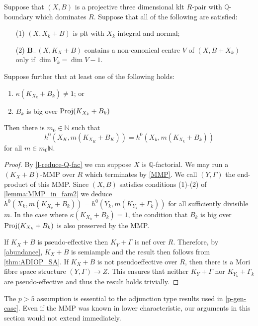 \documentclass[a4paper,12pt]{book}
\begin{document}
	\begin{theorem}\label{thm:ADIOP_final2}
		Suppose that $(X,B)$ is a projective three dimensional klt $R$-pair with $\mathbb{Q}$-boundary which dominates $R$.
		Suppose that all of the following are satisfied:
		
		\begin{enumerate}
			\item[(1)] $(X, X_{k}+B)$ is plt with $X_k$ integral and normal;
			\item[(2)]  ${\mathbf{B}_{-}(X, K_{X}+B)}$ contains a non-canonical centre $V$ of $(X,B+X_{k})$ only if $\dim V_{k}=\dim V -1$.
		\end{enumerate}
		
		Suppose further that at least one of the following holds:
		\begin{enumerate}
			\item $\kappa(K_{X_{k}}+B_{k}) \neq 1$; or
			\item $B_{k}$ is big over $\textup{Proj}(K_{X_{k}}+B_{k})$
		\end{enumerate}	
		Then there is $m_{0} \in \mathbb{N}$ such that 
		$$h^{0}(X_{K},m(K_{X_{K}}+B_{K}))=h^{0}(X_{k},m(K_{X_{k}}+B_{k}))$$
		for all $m \in m_{0}\mathbb{N}$.
		
	\end{theorem}
	
	\begin{proof}
		By \autoref{l-reduce-Q-fac} we can suppose $X$ is $\mathbb{Q}$-factorial.
		We may run a $(K_X+B)$-MMP over $R$ which terminates by \autoref{MMP}. 
		We call $(Y,\Gamma)$ the end-product of this MMP. Since $(X,B)$ satisfies conditions (1)-(2) of \autoref{lemma:MMP_in_fam2} we deduce $h^{0}(X_{k},m(K_{X_{k}} + B_{k}))=h^0(Y_k, m(K_{Y_k}+\Gamma_k))$ for all sufficiently divisible $m$. 
		In the case where $\kappa(K_{X_{k}}+B_{k})=1$, the condition that $B_{k}$ is big over $\textup{Proj}(K_{X_{k}}+B_{k})$ is also preserved by the MMP.
		
		If $K_{X}+B$ is pseudo-effective then $K_Y+\Gamma$ is nef over $R$. Therefore, by \autoref{abundance}, $K_{X}+B$ is semiample and the result then follows from \autoref{thm:ADIOP_SA}. 
		If $K_X+B$ is not pseudoeffective over $R$, then there is a Mori fibre space structure $(Y,\Gamma) \to Z$. This ensures that neither $K_{Y}+\Gamma$ nor $K_{Y_{k}}+\Gamma_{k}$ are pseudo-effective and thus the result holds trivially. 
	\end{proof}
	
	
	\begin{remark}	
		The $p>5$ assumption is essential to the adjunction type results used  in \autoref{p-gen-case}. Even if the MMP was known in lower characteristic, our arguments in this section would not extend immediately.
	\end{remark}
	
	
	
\end{document}
